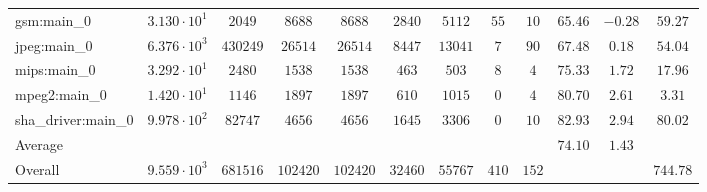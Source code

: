 \begin{tabular}{|l|c|c|c|c|c|c|c|c|c|c|c|}
gsm:main\_0             & $ 3.130 \cdot 10^{1} $ & $ 2049   $ & $ 8688   $ & $ 8688   $ & $ 2840  $ & $ 5112  $ & $ 55  $ & $ 10  $ & $ 65.46       $ & $ -0.28   $ & $ 59.27   $ \\
jpeg:main\_0            & $ 6.376 \cdot 10^{3} $ & $ 430249 $ & $ 26514  $ & $ 26514  $ & $ 8447  $ & $ 13041 $ & $ 7   $ & $ 90  $ & $ 67.48       $ & $ 0.18    $ & $ 54.04   $ \\
mips:main\_0            & $ 3.292 \cdot 10^{1} $ & $ 2480   $ & $ 1538   $ & $ 1538   $ & $ 463   $ & $ 503   $ & $ 8   $ & $ 4   $ & $ 75.33       $ & $ 1.72    $ & $ 17.96   $ \\
mpeg2:main\_0           & $ 1.420 \cdot 10^{1} $ & $ 1146   $ & $ 1897   $ & $ 1897   $ & $ 610   $ & $ 1015  $ & $ 0   $ & $ 4   $ & $ 80.70       $ & $ 2.61    $ & $ 3.31    $ \\
sha\_driver:main\_0     & $ 9.978 \cdot 10^{2} $ & $ 82747  $ & $ 4656   $ & $ 4656   $ & $ 1645  $ & $ 3306  $ & $ 0   $ & $ 10  $ & $ 82.93       $ & $ 2.94    $ & $ 80.02   $ \\
\hline
Average                 & $                    $ & $        $ & $        $ & $        $ & $       $ & $       $ & $     $ & $     $ & $ 74.10       $ & $ 1.43    $ & $         $ \\
\hline
Overall                 & $ 9.559 \cdot 10^{3} $ & $ 681516 $ & $ 102420 $ & $ 102420 $ & $ 32460 $ & $ 55767 $ & $ 410 $ & $ 152 $ & $             $ & $         $ & $ 744.78  $ \\
\hline
\end{tabular}
